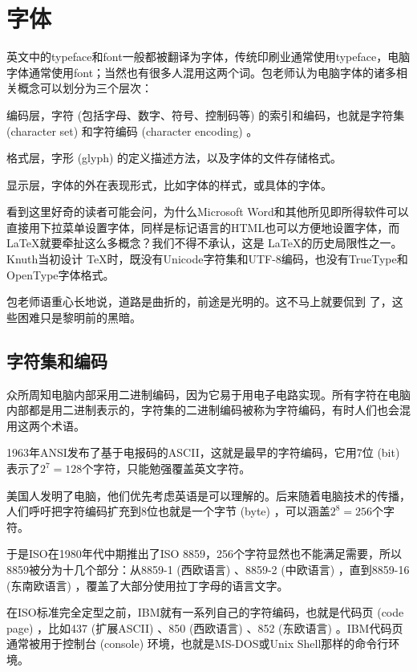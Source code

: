 \chapter{字体}

英文中的typeface和font一般都被翻译为字体，传统印刷业通常使用typeface，电脑字体通常使用font；当然也有很多人混用这两个词。包老师认为电脑字体的诸多相关概念可以划分为三个层次：

\begin{compactenum}
    \item 编码层，字符 (包括字母、数字、符号、控制码等) 的索引和编码，也就是字符集 (character set) 和字符编码 (character encoding) 。
    \item 格式层，字形 (glyph) 的定义描述方法，以及字体的文件存储格式。
    \item 显示层，字体的外在表现形式，比如字体的样式，或具体的字体。
\end{compactenum}

看到这里好奇的读者可能会问，为什么Microsoft Word和其他所见即所得软件可以直接用下拉菜单设置字体，同样是标记语言的HTML也可以方便地设置字体，而 \LaTeX 就要牵扯这么多概念？我们不得不承认，这是 \LaTeX 的历史局限性之一。Knuth\indexKnuth 当初设计 \TeX 时，既没有Unicode字符集和UTF-8编码，也没有TrueType和OpenType字体格式。

包老师语重心长地说，道路是曲折的，前途是光明的。这不马上就要侃到 \XeTeX 了，这些困难只是黎明前的黑暗。

\section{字符集和编码}
\label{sec:encoding}

众所周知电脑内部采用二进制编码，因为它易于用电子电路实现。所有字符在电脑内部都是用二进制表示的，字符集的二进制编码被称为字符编码，有时人们也会混用这两个术语。

1963年ANSI\indexANSI 发布了基于电报码的ASCII，这就是最早的字符编码，它用7位 (bit) 表示了$2^7=128$个字符，只能勉强覆盖英文字符。

美国人发明了电脑，他们优先考虑英语是可以理解的。后来随着电脑技术的传播，人们呼吁把字符编码扩充到8位也就是一个字节 (byte) ，可以涵盖$2^8=256$个字符。

于是ISO\indexISO 在1980年代中期推出了ISO 8859，256个字符显然也不能满足需要，所以8859被分为十几个部分：从8859-1 (西欧语言) 、8859-2 (中欧语言) ，直到8859-16 (东南欧语言) ，覆盖了大部分使用拉丁字母的语言文字。

在ISO标准完全定型之前，IBM就有一系列自己的字符编码，也就是代码页 (code page) ，比如437 (扩展ASCII) 、850 (西欧语言) 、852 (东欧语言) 。IBM\indexIBM 代码页通常被用于控制台 (console) 环境，也就是MS-DOS或Unix Shell那样的命令行环境。

